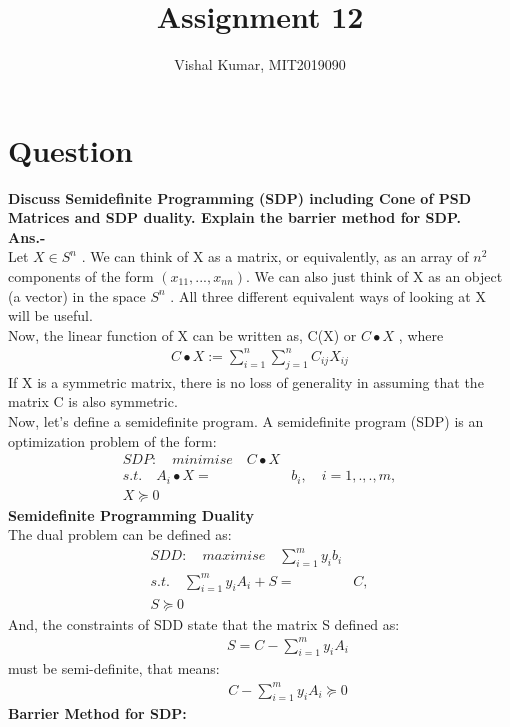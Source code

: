 \documentclass[fleqn]{article}
\title{Assignment 12}
\author{Vishal Kumar, MIT2019090}
\date{}
\begin{document}
\maketitle
\section*{Question}
{\bf Discuss Semidefinite Programming (SDP) including Cone of PSD Matrices and SDP duality. Explain the barrier method for SDP.}
\\
{\bf Ans.-}
\\

Let $X \in S^n$ . We can think of X as a matrix, or equivalently, as an array of $n^2$ components of the form $(x_{11}, . . . , x_{nn})$. We can also just think of X as
an object (a vector) in the space $S^n$ . All three different equivalent ways of looking at X will be useful. 
\\

Now, the linear function of X can be written as, C(X) or $C\bullet X$ , where
\begin{align*}
C\bullet X := \sum_{i=1}^n \sum_{j=1}^n C_{ij} X_{ij}
\end{align*}
If X is a symmetric matrix, there is no loss of generality in assuming that the matrix C is also symmetric. 
\\

Now, let's define a semidefinite program. A semidefinite program (SDP) is an optimization problem of the form:
\begin{align*}
SDP:\quad minimise\quad C\bullet X 
\\ 
s.t.\quad A_i\bullet X =& b_i,\quad i=1,.,.,m,
\\
X \succeq 0
\end{align*}
{\bf Semidefinite Programming Duality}
\\

The dual problem can be defined as:
\begin{align*}
SDD:\quad maximise\quad \sum_{i=1}^m y_ib_i
\\ 
s.t.\quad \sum_{i=1}^m y_iA_i + S =& C,
\\
S \succeq 0
\end{align*}
And, the constraints of SDD state that the matrix S defined as:
\begin{align*}
\qquad \qquad S = C - \sum_{i=1}^m y_iA_i
\end{align*}
must be semi-definite, that means:
\begin{align*}
\qquad \qquad C - \sum_{i=1}^m y_iA_i \succeq 0
\end{align*}
{\bf Barrier Method for SDP:}
\\
\end{document}
